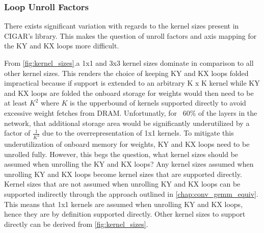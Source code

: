 \subsubsection{Loop Unroll Factors}
\label{chap:dataflow_dse:pruning:applying_it:loop_unroll_factors}

There exists significant variation with regards to the kernel sizes present in
CIGAR's library. This makes the question of unroll factors and axis mapping for
the KY and KX loops more difficult.

From \autoref{fig:kernel_sizes}.a 1x1 and 3x3 kernel sizes dominate in
comparison to all other kernel sizes. This renders the choice of keeping KY and
KX loops folded impractical because if support is extended to an arbitrary K x K
kernel while KY and KX loops are folded the onboard storage for weights would
then need to be at least $K^2$ where $K$ is the upperbound of kernels supported
directly to avoid excessive weight fetches from DRAM. Unfortunatly, for ~60\% of
the layers in the network, that additional storage area would be significantly
underutilized by a factor of $\frac{1}{K^2}$ due to the overrepresentation of
1x1 kernels. To mitigate this underutilization of onboard memory for weights, KY
and KX loops need to be unrolled fully. However, this begs the question, what
kernel sizes should be assumed when unrolling the KY and KX loops? Any kernel
sizes assumed when unrolling KY and KX loops become kernel sizes that are
supported directly. Kernel sizes that are not assumed when unrolling KY and KX
loops can be supported indirectly through the approach outlined in
\autoref{chap:conv_gemm_equiv}. This means that 1x1 kernels are assumed when
unrolling KY and KX loops, hence they are by definition supported directly.
Other kernel sizes to support directly can be derived from
\autoref{fig:kernel_sizes}. 

